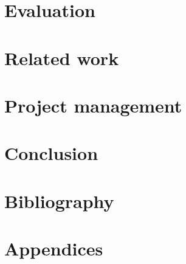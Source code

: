 \documentclass{article}
\begin{document}
\section{Evaluation}


\section{Related work}

\section{Project management}

\section{Conclusion}
\label{sec:conclusion}


\section{Bibliography}
\label{sec:biblio}


\clearpage

\section{Appendices}
\label{sec:appendix}

\end{document}

